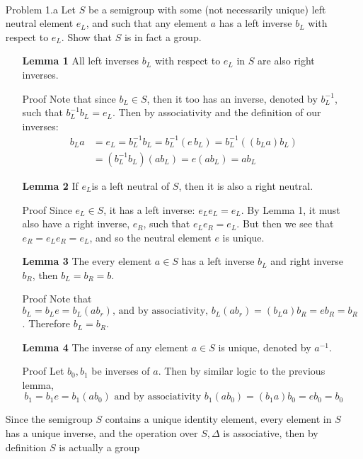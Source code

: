 \documentclass[letterpaper]{article}
\begin{document}
 \\
\begin{itemize}
    \item[Problem 1.a] Let \(S\) be a semigroup with some (not necessarily unique) left neutral element \(e_L\), and such that any element \(a\) has a left inverse \(b_L\) with respect to \(e_L\). Show that \(S\) is in fact a group.
          \begin{itemize}
              \item[\textbf{Lemma 1}] All left inverses \(b_L\) with respect to \(e_L\) in \(S\) are also right inverses.

              \item[Proof] Note that since \(b_L \in S\), then it too has an inverse, denoted by \(b_{L}^{-1}\), such that \(b_{L}^{-1}b_{L} = e_{L}\). Then by associativity and the definition of our inverses:
                    \begin{align*}
                        b_{L}a & = e_L = b_{L}^{-1}b_L = b_{L}^{-1}(e\,b_L) = b_{L}^{-1}((b_{L}a)b_L) \\ & = (b_{L}^{-1}b_L)(ab_L) = e(ab_L) = ab_L
                    \end{align*}
              \item[\textbf{Lemma 2}] If \(e_{L}\)is a left neutral of \(S\), then it is also a right neutral.

              \item[Proof] Since \(e_L \in S\), it has a left inverse: \(e_{L}e_{L} = e_{L}\).
                    By Lemma 1, it must also have a right inverse, \(e_R\), such that \(e_{L}e_{R} = e_{L}\).
                    But then we see that \(e_R = e_{L}e_{R} = e_L\), and so the neutral element \(e\) is unique.
              \item[\textbf{Lemma 3}] The every element \(a \in S\) has a left inverse \(b_L\) and right inverse \(b_R\), then \(b_L = b_R = b\).

              \item[Proof] Note that \(b_L = b_Le = b_L(ab_r) \text{, and by associativity, } b_L(ab_r) = (b_L{a})b_R = eb_R = b_R \). Therefore \(b_L = b_R\).
              \item[\textbf{Lemma 4}] The inverse of any element \(a \in S\) is unique, denoted by \(a^{-1}\).

              \item[Proof] Let \(b_0, b_1\) be inverses of \(a\). Then by similar logic to the previous lemma,
                    \[b_{1} = b_{1}e =  b_{1}(ab_0) \text{ and by associativity } b_{1}({a}{b_0}) = ({b_1}{a})b_0 = eb_0 = b_0\]
          \end{itemize}
          Since the semigroup \(S\) contains a unique identity element, every element in \(S\) has a unique inverse, and the operation over \(S, \Delta\) is associative, then by definition \(S\) is actually a group



\end{itemize}
\end{document}
